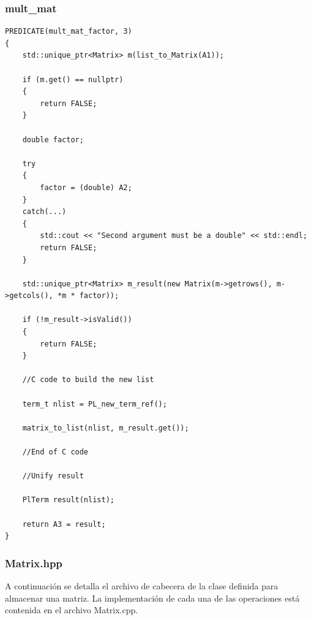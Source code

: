 \documentclass[a4paper]{article}
\begin{document}
\subsubsection{mult\_mat}
\begin{lstlisting}[style=C++]
PREDICATE(mult_mat_factor, 3)
{
    std::unique_ptr<Matrix> m(list_to_Matrix(A1));

    if (m.get() == nullptr)
    {
        return FALSE;
    }

    double factor;

    try
    {
        factor = (double) A2;
    }
    catch(...)
    {
        std::cout << "Second argument must be a double" << std::endl;
        return FALSE;
    }

    std::unique_ptr<Matrix> m_result(new Matrix(m->getrows(), m->getcols(), *m * factor));

    if (!m_result->isValid())
    {
        return FALSE;
    }

    //C code to build the new list

    term_t nlist = PL_new_term_ref();

    matrix_to_list(nlist, m_result.get());

    //End of C code

    //Unify result

    PlTerm result(nlist);
	
    return A3 = result;
}
\end{lstlisting}
\subsubsection{Matrix.hpp}
A continuación se detalla el archivo de cabecera de la clase definida para almacenar una matriz. La implementación de cada una de las operaciones está contenida en el archivo Matrix.cpp.
\end{document}
